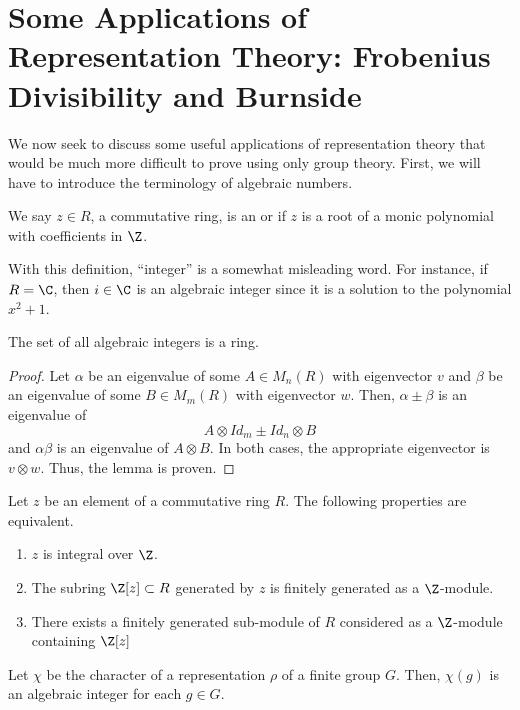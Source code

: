 \documentclass[11pt,leqno,oneside]{amsbook}
\numberwithin{thm}{section}
\begin{document}
\section{Some Applications of Representation Theory: Frobenius
  Divisibility and Burnside}
We now seek to discuss some useful applications of representation
theory that would be much more difficult to prove using only group
theory. First, we will have to introduce the terminology of algebraic
numbers.
\begin{defn}
  We say \(z \in R\), a commutative ring, is an 
  or  if \(z\) is a root of a monic
  polynomial with coefficients in \(\Z\).
\end{defn}
\begin{rmk}
  With this definition, ``integer'' is a somewhat misleading word. For
  instance, if \(R = \C\), then \(i \in \C\) is an algebraic integer
  since it is a solution to the polynomial \(x^2+1\).
\end{rmk}
\begin{lem}
  The set of all algebraic integers is a ring.
\end{lem}
\begin{proof}
  Let \(\alpha\) be an eigenvalue of some \(A \in M_n(R)\) with
  eigenvector \(v\) and
  \(\beta\) be an eigenvalue of some \(B \in M_m(R)\) with eigenvector
  \(w\). Then, \(\alpha \pm \beta\) is an eigenvalue of \[
    A \otimes Id_m \pm Id_n \otimes B
  \]
  and \(\alpha \beta\) is an eigenvalue of \(A \otimes B\). In both
  cases, the appropriate eigenvector is \(v \otimes w\). Thus, the
  lemma is proven.
\end{proof}
\begin{prop}
  Let \(z\) be an element of a commutative ring \(R\). The following
  properties are equivalent.
  \begin{enumerate}
  \item \(z\) is integral over \(\Z\).
  \item The subring \(\Z[z] \subset R\) generated by \(z\) is finitely
    generated as a \(\Z\)-module.
  \item There exists a finitely generated sub-module of \(R\)
    considered as a \(\Z\)-module containing \(\Z[z]\)
  \end{enumerate}
\end{prop}
\begin{prop}\label{characters-are-algebraic-integers}
  Let \(\chi\) be the character of a representation \(\rho\) of a finite group
  \(G\). Then, \(\chi(g)\) is an algebraic integer for each \(g \in G\).
\end{prop}
\end{document}
